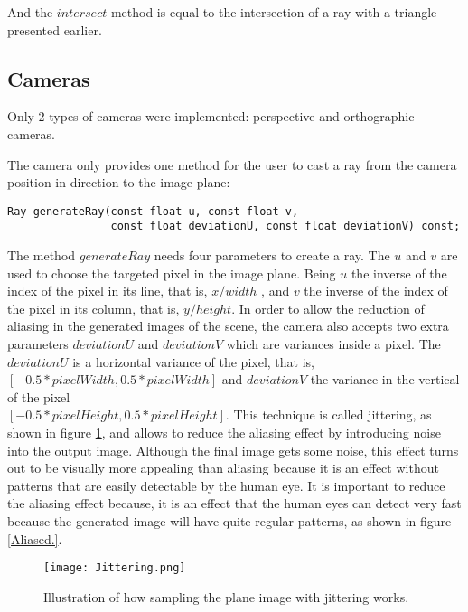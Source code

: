 \par
And the
$intersect$
method is equal to the intersection of a ray with a triangle presented earlier.

\subsection{Cameras}

\par
Only 2 types of cameras were implemented: perspective and orthographic cameras.

\par
The camera only provides one method for the user to cast a ray from the camera position in direction to the image plane:

\begin{lstlisting}
Ray generateRay(const float u, const float v,
                const float deviationU, const float deviationV) const;
\end{lstlisting}

\par
The method
$generateRay$
needs four parameters to create a ray.
The $u$ and $v$
are used to choose the targeted pixel in the image plane.
Being
$u$
the inverse of the index of the pixel in its line, that is,
$x / width$
, and
$v$
the inverse of the index of the pixel in its column, that is,
$y / height$.
In order to allow the reduction of aliasing in the generated images of the scene, the camera also accepts two extra parameters
$deviationU$ and $deviationV$
which are variances inside a pixel.
The
$deviationU$
is a horizontal variance of the pixel, that is,\\
$[-0.5*pixelWidth, 0.5*pixelWidth]$
and
$deviationV$ the variance in the vertical of the pixel\\
$[-0.5*pixelHeight, 0.5*pixelHeight]$.
This technique is called jittering, as shown in figure \ref{Jittering.}, and allows to reduce the aliasing effect by introducing noise into the output image.
Although the final image gets some noise, this effect turns out to be visually more appealing than aliasing because it is an effect without patterns that are easily detectable by the human eye.
It is important to reduce the aliasing effect because, it is an effect that the human eyes can detect very fast because the generated image will have quite regular patterns, as shown in figure \ref{Aliased.}.

\begin{figure}[H]
	\centering
	\caption{Illustration of how sampling the plane image with jittering works.}
	\label{Jittering.}
	\texttt{[image: Jittering.png]}
\end{figure}

